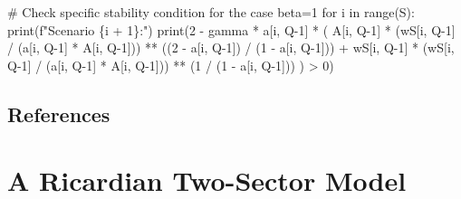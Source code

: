 \documentclass[
  letterpaper,
  DIV=11,
  numbers=noendperiod]{scrreprt}
\newenvironment{Shaded}{\begin{snugshade}}{\end{snugshade}}
\newcommand{\BuiltInTok}[1]{\textcolor[rgb]{0.00,0.23,0.31}{#1}}
\newcommand{\CommentTok}[1]{\textcolor[rgb]{0.37,0.37,0.37}{#1}}
\newcommand{\ControlFlowTok}[1]{\textcolor[rgb]{0.00,0.23,0.31}{#1}}
\newcommand{\DecValTok}[1]{\textcolor[rgb]{0.68,0.00,0.00}{#1}}
\newcommand{\KeywordTok}[1]{\textcolor[rgb]{0.00,0.23,0.31}{#1}}
\newcommand{\NormalTok}[1]{\textcolor[rgb]{0.00,0.23,0.31}{#1}}
\newcommand{\OperatorTok}[1]{\textcolor[rgb]{0.37,0.37,0.37}{#1}}
\newcommand{\SpecialCharTok}[1]{\textcolor[rgb]{0.37,0.37,0.37}{#1}}
\newcommand{\SpecialStringTok}[1]{\textcolor[rgb]{0.13,0.47,0.30}{#1}}
\begin{document}
\begin{tcolorbox}
\begin{Shaded}
\begin{Highlighting}[]
\CommentTok{\# Check specific stability condition for the case beta=1}
\ControlFlowTok{for}\NormalTok{ i }\KeywordTok{in} \BuiltInTok{range}\NormalTok{(S):}
    \BuiltInTok{print}\NormalTok{(}\SpecialStringTok{f"Scenario }\SpecialCharTok{\{}\NormalTok{i }\OperatorTok{+} \DecValTok{1}\SpecialCharTok{\}}\SpecialStringTok{:"}\NormalTok{)}
    \BuiltInTok{print}\NormalTok{(}\DecValTok{2} \OperatorTok{{-}}\NormalTok{ gamma }\OperatorTok{*}\NormalTok{ a[i, Q}\OperatorTok{{-}}\DecValTok{1}\NormalTok{] }\OperatorTok{*}\NormalTok{ (}
\NormalTok{        A[i, Q}\OperatorTok{{-}}\DecValTok{1}\NormalTok{] }\OperatorTok{*}\NormalTok{ (wS[i, Q}\OperatorTok{{-}}\DecValTok{1}\NormalTok{] }\OperatorTok{/}\NormalTok{ (a[i, Q}\OperatorTok{{-}}\DecValTok{1}\NormalTok{] }\OperatorTok{*}\NormalTok{ A[i, Q}\OperatorTok{{-}}\DecValTok{1}\NormalTok{])) }\OperatorTok{**}\NormalTok{ ((}\DecValTok{2} \OperatorTok{{-}}\NormalTok{ a[i, Q}\OperatorTok{{-}}\DecValTok{1}\NormalTok{]) }\OperatorTok{/}\NormalTok{ (}\DecValTok{1} \OperatorTok{{-}}\NormalTok{ a[i, Q}\OperatorTok{{-}}\DecValTok{1}\NormalTok{])) }\OperatorTok{+}
\NormalTok{        wS[i, Q}\OperatorTok{{-}}\DecValTok{1}\NormalTok{] }\OperatorTok{*}\NormalTok{ (wS[i, Q}\OperatorTok{{-}}\DecValTok{1}\NormalTok{] }\OperatorTok{/}\NormalTok{ (a[i, Q}\OperatorTok{{-}}\DecValTok{1}\NormalTok{] }\OperatorTok{*}\NormalTok{ A[i, Q}\OperatorTok{{-}}\DecValTok{1}\NormalTok{])) }\OperatorTok{**}\NormalTok{ (}\DecValTok{1} \OperatorTok{/}\NormalTok{ (}\DecValTok{1} \OperatorTok{{-}}\NormalTok{ a[i, Q}\OperatorTok{{-}}\DecValTok{1}\NormalTok{]))}
\NormalTok{    ) }\OperatorTok{\textgreater{}} \DecValTok{0}\NormalTok{)}
\end{Highlighting}
\end{Shaded}

\end{tcolorbox}

\section{References}\label{references-12}

\chapter{A Ricardian Two-Sector Model}\label{sec-ricardo_2}
\end{document}
